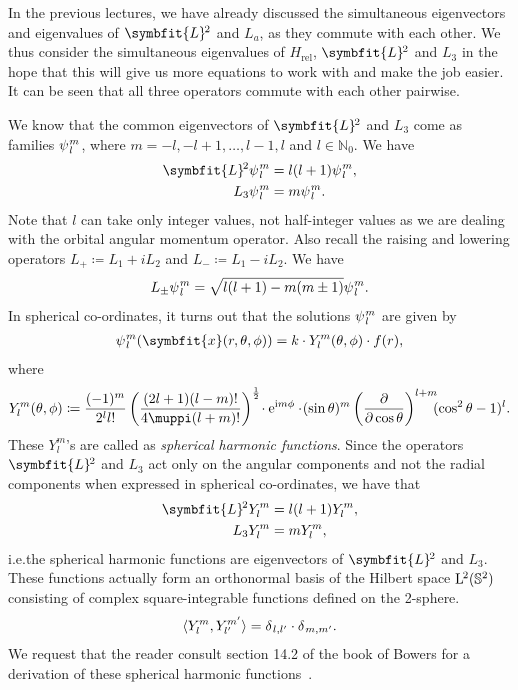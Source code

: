 \documentclass[12pt, a4 paper]{article}
\theoremstyle{definition}
\newcommand{\nn}{\mathbb{N}_0}
\renewcommand{\i}{\mathrm{i}}
\newcommand{\e}{\mathrm{e}}
\renewcommand{\pi}{\muppi}
\newcommand{\lvecsquare}{\symbfit{L}\kern-1pt^2}
\begin{document}
	In the previous lectures, we have already discussed the simultaneous eigenvectors and eigenvalues of $\lvecsquare$ and $L_a$, as they commute with each other. We thus consider the simultaneous eigenvalues of $H_\text{rel}$, $\lvecsquare$ and $L_3$ in the hope that this will give us more equations to work with and make the job easier. It can be seen that all three operators commute with each other pairwise.

	We know that the common eigenvectors of $\lvecsquare$ and $L_3$ come as families $\psi\kern0.5pt_l^m$, where $m = -l, -l+1, \ldots, l-1, l$ and $l \in \nn$. We have
	\begin{align*}
	    \lvecsquare \psi\kern0.5pt_l^m &= l(l+1)\psi\kern0.5pt_l^m,\\
		L_3 \psi\kern0.5pt_l^m &= m \psi\kern0.5pt_l^m.
	\end{align*}
	Note that $l$ can take only integer values, not half-integer values as we are dealing with the orbital angular momentum operator. Also recall the raising and lowering operators $L_+ \coloneq L_1 + i L_2$ and $L_- \coloneq L_1 - iL_2$. We have
	\begin{align*}
		L_\pm \psi\kern0.5pt_l^m = \sqrt{l(l+1) - m(m\pm 1)} \psi\kern0.5pt_l^m.
	\end{align*}
	In spherical co-ordinates, it turns out that the solutions $\psi\kern0.5pt_l^m$ are given by
	\begin{align*}
		\psi\kern0.5pt_l^m (\symbfit{x} (r, \theta, \phi)) = k \cdot Y^m_l (\theta, \phi) \cdot f(r),
	\end{align*}
	where
	\begin{align*}
		Y^m_l (\theta, \phi) \coloneq \frac{(-1)^m}{2^l l!}\left(\frac{(2l+1) (l-m)!}{4\pi (l+m)!}\right)^{\frac{1}{2}}\!\cdot\e^{\i m\phi}\cdot\!(\sin{\theta})^m \left(\frac{\partial}{\partial \cos{\theta}}\right)^{l+m}\!\!\!(\cos^2{\theta} -1)^l.
	\end{align*}
	These $Y_l^m$'s are called as \textit{spherical harmonic functions}. Since the operators $\lvecsquare$ and $L_3$ act only on the angular components and not the radial components when expressed in spherical co-ordinates, we have that
	\begin{align*}
	    \lvecsquare Y_l^m &= l(l+1) Y_l^m,\\
		L_3 Y_l^m &= m Y_l^m,
	\end{align*}
	i.e.\@ the spherical harmonic functions are eigenvectors of $\lvecsquare$ and $L_3$. These functions actually form an orthonormal basis of the Hilbert space $\mathrm{L}\kern-0.7pt^2(\mathbb{S}^2)$ consisting of complex square-integrable functions defined on the 2-sphere.
	\begin{align*}
		\langle Y_l^m , Y_{l'}^{m'} \rangle = \delta\kern0.5pt_{l, l'}\cdot\delta\kern0.4pt_{m, m'}.
	\end{align*}
	We request that the reader consult section 14.2 of the book of Bowers for a derivation of these spherical harmonic functions~\cite[p.~200]{Bowers}.
\end{document}
